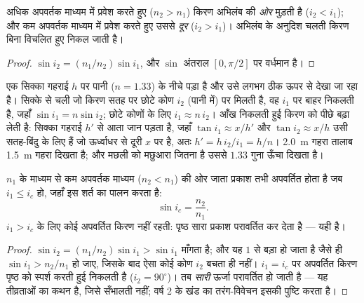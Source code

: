 \begin{proposition}[किरण किस ओर मुड़ती है]\label{prop:b1:rays-reflection-refraction:bending}
अधिक अपवर्तक माध्यम में प्रवेश करते हुए ($n_2 > n_1$) किरण अभिलंब की
\emph{ओर} मुड़ती है ($i_2 < i_1$); और कम अपवर्तक माध्यम में प्रवेश करते हुए
उससे \emph{दूर} ($i_2 > i_1$)। अभिलंब के अनुदिश चलती किरण बिना विचलित हुए
निकल जाती है।
\end{proposition}

\begin{proof}
$\sin i_2 = (n_1/n_2)\sin i_1$, और $\sin$ अंतराल $[0, \pi/2]$ पर वर्धमान
है।
\end{proof}

\begin{example}[आभासी गहराई]\label{ex:b1:rays-reflection-refraction:depth}
एक सिक्का गहराई $h$ पर पानी ($n = 1.33$) के नीचे पड़ा है और उसे लगभग ठीक ऊपर
से देखा जा रहा है। सिक्के से चली जो किरण सतह पर छोटे कोण $i_2$ (पानी में) पर
मिलती है, वह $i_1$ पर बाहर निकलती है, जहाँ $\sin i_1 = n\sin i_2$; छोटे कोणों
के लिए $i_1 \approx n\,i_2$। आँख निकलती हुई किरण को पीछे बढ़ा लेती है: सिक्का
गहराई $h'$ से आता जान पड़ता है, जहाँ $\tan i_1 \approx x/h'$ और
$\tan i_2 \approx x/h$ उसी सतह-बिंदु के लिए हैं जो ऊर्ध्वाधर से दूरी $x$ पर
है, अतः
$h' = h\,i_2/i_1 = h/n$। \qty{2.0}{m} गहरा तालाब \qty{1.5}{m} गहरा दिखता है;
और मछली को मछुआरा जितना है उससे $1.33$ गुना ऊँचा दिखता है।
\end{example}

\begin{theorem}[पूर्ण आंतरिक परावर्तन]\label{thm:b1:rays-reflection-refraction:tir}
 $n_1$ के माध्यम से कम अपवर्तक माध्यम ($n_2 < n_1$) की ओर जाता
प्रकाश तभी अपवर्तित होता है जब $i_1 \leq i_c$ हो, जहाँ \emph{}
इस शर्त का पालन करता है:
\[
\sin i_c = \frac{n_2}{n_1} .
\]
$i_1 > i_c$ के लिए कोई अपवर्तित किरण नहीं रहती: पृष्ठ सारा प्रकाश परावर्तित
कर देता है --- यही \emph{} है।
\end{theorem}

\begin{proof}
 $\sin i_2 = (n_1/n_2)\sin i_1 > \sin i_1$ माँगता है; और यह $1$
से बड़ा हो जाता है जैसे ही $\sin i_1 > n_2/n_1$ हो जाए, जिसके बाद ऐसा कोई कोण
$i_2$ बचता ही नहीं। $i_1 = i_c$ पर अपवर्तित किरण पृष्ठ को स्पर्श करती हुई
निकलती है ($i_2 = 90^\circ$)। तब \emph{सारी} ऊर्जा परावर्तित हो जाती है ---
यह तीव्रताओं का कथन है, जिसे  सँभालती नहीं; वर्ष 2 के खंड
का तरंग-विवेचन इसकी पुष्टि करता है।
\end{proof}

